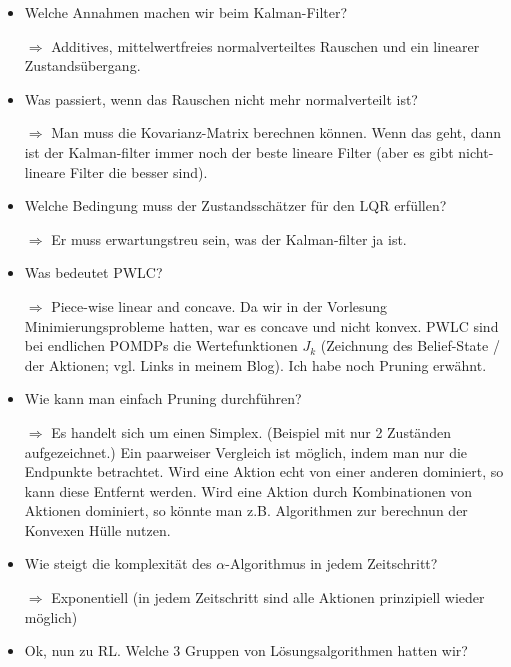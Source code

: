 \documentclass[a4paper]{article}
\begin{document}
\begin{itemize}
        \item Welche Annahmen machen wir beim Kalman-Filter?
        \item[$\Rightarrow$] Additives, mittelwertfreies normalverteiltes Rauschen und
                             ein linearer Zustandsübergang.
        \item Was passiert, wenn das Rauschen nicht mehr normalverteilt ist?
        \item[$\Rightarrow$] Man muss die Kovarianz-Matrix berechnen können.
                             Wenn das geht, dann ist der Kalman-filter immer noch
                             der beste lineare Filter (aber es gibt nicht-lineare
                             Filter die besser sind).
        \item Welche Bedingung muss der Zustandsschätzer für den LQR erfüllen?
        \item[$\Rightarrow$] Er muss erwartungstreu sein, was der Kalman-filter ja ist.
        \item Was bedeutet PWLC?
        \item[$\Rightarrow$] Piece-wise linear and concave. Da wir in der Vorlesung
                             Minimierungsprobleme hatten, war es concave und
                             nicht konvex. PWLC sind bei endlichen POMDPs
                             die Wertefunktionen $J_k$ (Zeichnung des Belief-State / der Aktionen; vgl. Links in meinem Blog). Ich habe noch Pruning erwähnt.
        \item Wie kann man einfach Pruning durchführen?
        \item[$\Rightarrow$] Es handelt sich um einen Simplex. (Beispiel mit nur
                              2 Zuständen aufgezeichnet.) Ein paarweiser
                              Vergleich ist möglich, indem man nur die Endpunkte
                              betrachtet. Wird eine Aktion echt von einer anderen
                              dominiert, so kann diese Entfernt werden.
                              Wird eine Aktion durch Kombinationen von
                              Aktionen dominiert, so könnte man z.B. Algorithmen
                              zur berechnun der Konvexen Hülle nutzen.
        \item Wie steigt die komplexität des $\alpha$-Algorithmus in jedem
              Zeitschritt?
        \item[$\Rightarrow$] Exponentiell (in jedem Zeitschritt sind alle
              Aktionen prinzipiell wieder möglich)
        \item Ok, nun zu RL. Welche 3 Gruppen von Lösungsalgorithmen hatten wir?

\end{itemize}
\end{document}
